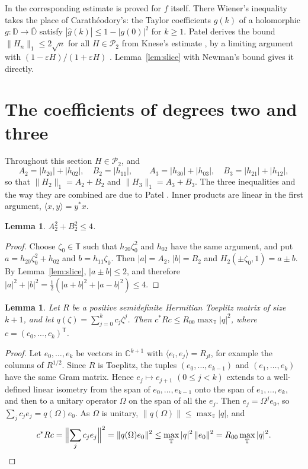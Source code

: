 \documentclass[11pt]{amsart}
\newtheorem{lemma}[theorem]{Lemma}
\theoremstyle{remark}
\numberwithin{equation}{section}
\newcommand{\C}{\mathbb{C}}
\newcommand{\D}{\mathbb{D}}
\newcommand{\T}{\mathbb{T}}
\newcommand{\Pclass}{\mathcal{P}_2}
\begin{document}
In \cite{BCGMMS21} the corresponding estimate is proved for $f$ itself. There Wiener's inequality takes the place of Carath\'eodory's: the Taylor coefficients $\hat g(k)$ of a holomorphic $g\colon\D\to\overline{\D}$ satisfy $|\hat g(k)|\le1-|g(0)|^2$ for $k\ge1$. Patel derives the bound $\|H_n\|_1\le2\sqrt n$ for all $H\in\Pclass$ from Knese's estimate \cite[Lemma~2.1]{Kne25}, by a limiting argument with $(1-\varepsilon H)/(1+\varepsilon H)$ \cite{PatMDB}. Lemma~\ref{lem:slice} with Newman's bound gives it directly.

\section{The coefficients of degrees two and three}\label{sec:patel}

Throughout this section $H\in\Pclass$, and
\[
A_2=|h_{20}|+|h_{02}|,\quad B_2=|h_{11}|,\qquad A_3=|h_{30}|+|h_{03}|,\quad B_3=|h_{21}|+|h_{12}|,
\]
so that $\|H_2\|_1=A_2+B_2$ and $\|H_3\|_1=A_3+B_3$. The three inequalities and the way they are combined are due to Patel \cite{PatMDB}. Inner products are linear in the first argument, $\langle x,y\rangle=y^*x$.

\begin{lemma}\label{lem:quad}
$A_2^2+B_2^2\le4$.
\end{lemma}

\begin{proof}
Choose $\zeta_0\in\T$ such that $h_{20}\zeta_0^2$ and $h_{02}$ have the same argument, and put $a=h_{20}\zeta_0^2+h_{02}$ and $b=h_{11}\zeta_0$. Then $|a|=A_2$, $|b|=B_2$ and $H_2(\pm\zeta_0,1)=a\pm b$. By Lemma~\ref{lem:slice}, $|a\pm b|\le2$, and therefore $|a|^2+|b|^2=\tfrac12(|a+b|^2+|a-b|^2)\le4$.
\end{proof}

\begin{lemma}\label{lem:toeplitz}
Let $R$ be a positive semidefinite Hermitian Toeplitz matrix of size $k+1$, and let $q(\zeta)=\sum_{j=0}^kc_j\zeta^j$. Then $c^*Rc\le R_{00}\max_\T|q|^2$, where $c=(c_0,\dots,c_k)^{\mathsf T}$.
\end{lemma}

\begin{proof}
Let $e_0,\dots,e_k$ be vectors in $\C^{k+1}$ with $\langle e_l,e_j\rangle=R_{jl}$, for example the columns of $R^{1/2}$. Since $R$ is Toeplitz, the tuples $(e_0,\dots,e_{k-1})$ and $(e_1,\dots,e_k)$ have the same Gram matrix. Hence $e_j\mapsto e_{j+1}$ $(0\le j<k)$ extends to a well-defined linear isometry from the span of $e_0,\dots,e_{k-1}$ onto the span of $e_1,\dots,e_k$, and then to a unitary operator $\Omega$ on the span of all the $e_j$. Then $e_j=\Omega^je_0$, so $\sum_jc_je_j=q(\Omega)e_0$. As $\Omega$ is unitary, $\|q(\Omega)\|\le\max_\T|q|$, and
\[
c^*Rc=\Bigl\|\sum_jc_je_j\Bigr\|^2=\|q(\Omega)e_0\|^2\le\max_\T|q|^2\,\|e_0\|^2=R_{00}\max_\T|q|^2.\qedhere
\]
\end{proof}
\end{document}
